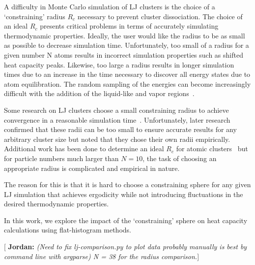 \documentclass[letterpaper,twocolumn,amsmath,amssymb,pre,aps,10pt]{revtex4-1}
\newcommand{\blue}[1]{{\bf \color{blue} #1}}
\newcommand{\jpsays}[1]{{\color{red} [\blue{Jordan:} \emph{#1}]}}
\begin{document}

A difficulty in Monte Carlo simulation of LJ clusters is the choice of a `constraining' radius $R_c$ necessary to prevent cluster dissociation.
The choice of an ideal $R_c$ presents critical problems in terms of accurately simulating thermodynamic
properties. Ideally, the user would like the radius to be as small as possible to decrease simulation time.
Unfortunately, too small of a radius for a given number N atoms results in incorrect simulation properties
such as shifted heat capacity peaks. Likewise, too large a radius results in longer simulation times
due to an increase in the time necessary to discover all energy states due to atom equilibration. The random
sampling of the energies can become increasingly difficult with the addition of the liquid-like and vapor regions~\cite{neirotti2000phase}.

Some research on LJ clusters choose a small constraining radius to achieve convergence in
a reasonable simulation time~\cite{neirotti2000phase}. Unfortunately, later research~\cite{frantz2001magic} confirmed that these radii can be too small
to ensure accurate results for any arbitrary cluster size but noted that they chose their own radii empirically. Additional work has been done to determine
an ideal $R_c$ for atomic clusters~\cite{yin2012massively} but for particle numbers much larger than $N=10$, the task of choosing an appropriate radius is complicated and empirical
in nature. 

The reason for this is that
it is hard to choose a constraining sphere for any given LJ simulation that achieves ergodicity while not
introducing fluctuations in the desired thermodynamic properties.

In this work, we explore the impact of the `constraining' sphere on heat capacity calculations using flat-histogram
methods.

\jpsays{(Need to fix lj-comparison.py to plot data probably manually is best by command line with argparse)
N = 38 for the radius comparison.}





\end{document}
